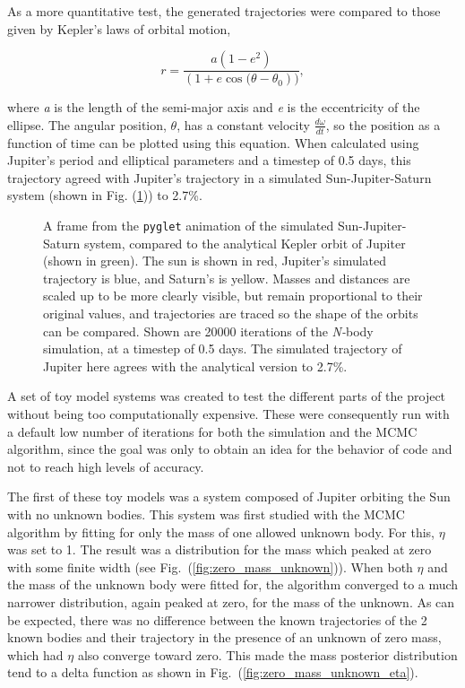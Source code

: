 \documentclass[twocolumn]{aastex63}
\begin{document}
As a more quantitative test, the generated trajectories were compared to those given by Kepler's laws of orbital motion,

\begin{equation}\label{eq:kepler}
    r = \frac{a(1-e^2)}{(1 + e\cos{(\theta - \theta_0}))},
\end{equation}{}

\noindent where \textit{a} is the length of the semi-major axis and \textit{e} is the eccentricity of the ellipse. The angular position, $\theta$, has a constant velocity $\frac{d\omega}{dt}$, so the position as a function of time can be plotted using this equation. When calculated using Jupiter's period and elliptical parameters and a timestep of 0.5 days, this trajectory agreed with Jupiter's trajectory in a simulated Sun-Jupiter-Saturn system (shown in Fig. (\ref{fig:sun_jup_sat_keplertest})) to 2.7\%.

\begin{figure}[ht!]
\caption{A frame from the {\tt\string pyglet} animation of the simulated Sun-Jupiter-Saturn system, compared to the analytical Kepler orbit of Jupiter (shown in green). The sun is shown in red, Jupiter's simulated trajectory is blue, and Saturn's is yellow. Masses and distances are scaled up to be more clearly visible, but remain proportional to their original values, and trajectories are traced so the shape of the orbits can be compared. Shown are 20000 iterations of the \textit{N-}body simulation, at a timestep of 0.5 days. The simulated trajectory of Jupiter here agrees with the analytical version to 2.7\%.  \label{fig:sun_jup_sat_keplertest}}
\end{figure}

A set of toy model systems was created to test the different parts of the project without being too computationally expensive. These were consequently run with a default low number of iterations for both the simulation and the MCMC algorithm, since the goal was only to obtain an idea for the behavior of code and not to reach high levels of accuracy. 

The first of these toy models was a system composed of Jupiter orbiting the Sun with no unknown bodies. This system was first studied with the MCMC algorithm by fitting for only the mass of one allowed unknown body. For this, $\eta$ was set to 1. The result was a distribution for the mass which peaked at zero with some finite width (see Fig.~(\ref{fig:zero_mass_unknown})). When both $\eta$ and the mass of the unknown body were fitted for, the algorithm converged to a much narrower distribution, again peaked at zero, for the mass of the unknown. As can be expected, there was no difference between the known trajectories of the 2 known bodies and their trajectory in the presence of an unknown of zero mass, which had $\eta$ also converge toward zero. This made the mass posterior distribution tend to a delta function as shown in Fig.~(\ref{fig:zero_mass_unknown_eta}).
\end{document}
